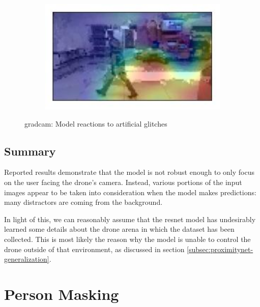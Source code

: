 \begin{figure}[!h]
\begin{center}
\begin{subfigure}[h]{0.24\textwidth}
		\end{subfigure}
		\hfill
		\begin{subfigure}[h]{0.24\textwidth}
			\centering
			\includegraphics[width=1\textwidth]{"contents/images/gradcam/gradcam-glitch-4"}
		\end{subfigure}
	\end{center}
	\vspace{-0.5cm}
	\caption[\gls{gradcam}: Model reactions to artificial glitches]{\gls{gradcam}: Model reactions to artificial glitches}
	\label{fig:gradcam-glitch}
\end{figure}



\subsection{Summary}
\label{subsec:proposed-approach}

Reported results demonstrate that the model is not robust enough to only focus on the user facing the drone's camera. Instead, various portions of the input images appear to be taken into consideration when the model makes predictions: many distractors are coming from the background.

In light of this, we can reasonably assume that the \gls{resnet} model has undesirably learned some details about the drone arena in which the dataset has been collected. This is most likely the reason why the model is unable to control the drone outside of that environment, as discussed in section \ref{subsec:proximitynet-generalization}.




\section{Person Masking}
\label{sec:masking}

